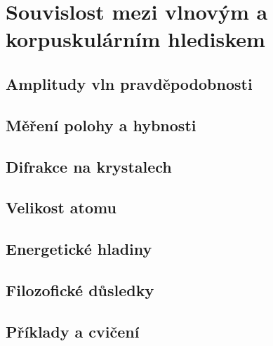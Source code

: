 \chapter{Souvislost mezi vlnovým a korpuskulárním hlediskem}\label{fyz:IchapXXXVIII}
\minitoc
  \section{Amplitudy vln pravděpodobnosti}\label{fyz:IchapXXXVIIIsecI}
  \section{Měření polohy a hybnosti}\label{fyz:IchapXXXVIIIsecII}
  \section{Difrakce na krystalech}\label{fyz:IchapXXXVIIIsecIII}
  \section{Velikost atomu}\label{fyz:IchapXXXVIIIsecIV}
  \section{Energetické hladiny}\label{fyz:IchapXXXVIIIsecV}
  \section{Filozofické důsledky}\label{fyz:IchapXXXVIIIsecVI}
  \section{Příklady a cvičení}\label{fyz:IchapXXXVIIIsecVII}